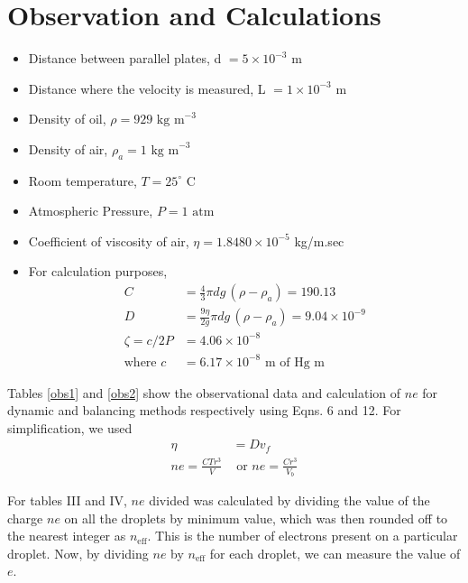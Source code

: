 \section{Observation and Calculations}

\begin{itemize}
    \item Distance between parallel plates, d $=5\times 10^{-3}$ m
    \item Distance where the velocity is measured, L $=1\times 10^{-3}$ m
    \item Density of oil, $\rho=929\text{ kg m}^{-3}$
    \item Density of air, $\rho_a=1\text{ kg m}^{-3}$
    \item Room temperature, $T=25^{\circ}\text{ C}$
    \item Atmospheric Pressure, $P=1\text{ atm}$
    \item Coefficient of viscosity of air, $\eta=1.8480 \times 10^{-5}$ kg/m.sec 
    \item For calculation purposes,
        \begin{align}
            C &= \frac{4}{3}\pi dg\,(\rho-\rho_a)=190.13\\
            D &= \frac{9\eta}{2g}\pi dg\,(\rho-\rho_a) = 9.04 \times 10^{-9}\\
            \zeta = c / 2P &= 4.06 \times 10^{-8}\\
            \text{where } c &= 6.17 \times 10^{-8} \text{ m of Hg m} \nonumber
        \end{align}
\end{itemize}

Tables \ref{obs1} and \ref{obs2} show the observational data and calculation of $ne$ for dynamic and balancing methods respectively using Eqns. 6 and 12. For simplification, we used
\begin{align*}
    \eta &= Dv_f\\
    ne = \frac{CTr^3}{V} &\text{ or }ne=\frac{Cr^3}{V_b}
\end{align*}




For tables III and IV, $ne$ divided was calculated by dividing the value of the charge $ne$ on all the droplets by minimum value, which was then rounded off to the nearest integer as
$n_\text{eff}$. This is the number of electrons present on a particular droplet. Now, by dividing $ne$ by $n_\text{eff}$ for each droplet, we can measure the value of $e$.

